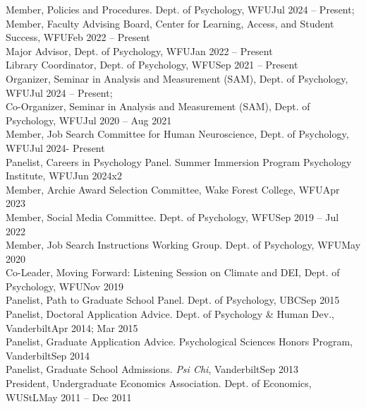Member, Policies and Procedures. Dept. of Psychology, WFU\hfill{Jul 2024 – Present;}\newline 
{}\smallskip\\
Member, Faculty Advising Board, Center for Learning, Access, and Student Success, WFU\hfill {Feb 2022 – Present}\\
Major Advisor, Dept. of Psychology, WFU\hfill{Jan 2022 – Present}\\
Library Coordinator, Dept. of Psychology, WFU\hfill {Sep 2021 – Present}\\
Organizer, Seminar in Analysis and Measurement (SAM), Dept. of Psychology, WFU\hfill{Jul 2024 – Present;}\newline 
{}\smallskip\\
Co-Organizer, Seminar in Analysis and Measurement (SAM), Dept. of Psychology, WFU\hfill {Jul 2020 – Aug 2021}\\
Member, Job Search Committee for Human Neuroscience, Dept. of Psychology, WFU\hfill {Jul 2024- Present}\\
Panelist, Careers in Psychology Panel. Summer Immersion Program Psychology Institute, WFU\hfill {Jun 2024x2}\\ %
Member, Archie Award Selection Committee, Wake Forest College, WFU\hfill{Apr 2023}\\ 
Member, Social Media Committee. Dept. of Psychology, WFU\hfill {Sep 2019 – Jul 2022}\\
Member, Job Search Instructions Working Group. Dept. of Psychology, WFU\hfill{May 2020}\\
Co-Leader, Moving Forward: Listening Session on Climate and DEI, Dept. of Psychology, WFU\hfill {Nov 2019}\\
Panelist, Path to Graduate School Panel. Dept. of Psychology, UBC\hfill {Sep 2015}\\
Panelist, Doctoral Application Advice. Dept. of Psychology \& Human Dev., Vanderbilt\hfill {Apr 2014; Mar 2015}\\
Panelist, Graduate Application Advice. Psychological Sciences Honors Program, Vanderbilt\hfill {Sep 2014}\\
Panelist, Graduate School Admissions. \textit{Psi Chi}, Vanderbilt\hfill{Sep 2013}\\
President, Undergraduate Economics Association. Dept. of Economics, WUStL\hfill{May 2011 – Dec 2011}\\
